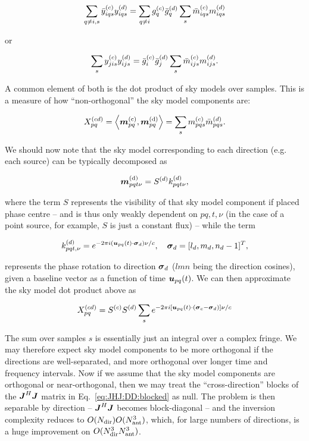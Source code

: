 \documentclass[useAMS,usenatbib]{mn2e}
\newcommand{\mat}[1]{{\bmath{#1}}}
\newcommand{\JJ}{\mat{J}} %
\newcommand{\JHJ}{\JJ^H\JJ} %
\begin{document}
\[
  \sum\limits_{q\ne i,s} \bar{y}^{(c)}_{iqs} y^{(d)}_{iqs} = \sum\limits_{q\ne i} g^{(c)}_q \bar{g}^{(d)}_q \sum_s \bar{m}^{(c)}_{iqs} m^{(d)}_{iqs}
\]

or

\[
  \sum\limits_{s} y^{(c)}_{jis} y^{(d)}_{ijs} = \bar{g}^{(c)}_i \bar{g}^{(d)}_j \sum_s \bar{m}^{(c)}_{ijs} m^{(d)}_{ijs}.
\]

A common element of both is the dot product of sky models over samples. This is a measure of how ``non-orthogonal'' the 
sky model components are:

\begin{equation}
\label{eq:Xpqcd}
X_{pq}^{(cd)} = \left \langle \bmath{m}_{pq}^\mathrm{(c)},\bmath{m}^\mathrm{(d)}_{pq} \right \rangle = \sum_s \mmc_{pqs} \mmdH_{pqs}.
\end{equation}

We should now note that the sky model corresponding to each direction (e.g. each source) can be typically decomposed as

\[
\bmath{m}_{pqt\nu}^\mathrm{(d)} = S^{(d)} k^{(d)}_{pqt\nu}, 
\]

where the term $S$ represents the visibility of that sky model component if placed phase centre -- and is thus only 
weakly dependent on $pq,t,\nu$ (in the case of a point source, for example, $S$ is just a constant flux) -- while the term

\[
k^{(d)}_{pqt,\nu} = e^{-2\pi i (\bmath{u}_{pq}(t)\cdot\bmath{\sigma}_d)\nu/c},~~~\bmath{\sigma}_d = [l_d,m_d,n_d-1]^T,
\]

represents the phase rotation to direction $\bmath{\sigma}_d$ ($lmn$ being the direction cosines), given a 
baseline vector as a function of time $\bmath{u}_{pq}(t)$. We can then approximate the sky model dot product above as

\[
X_{pq}^{(cd)} = S^{(c)}S^{(d)} \sum_s e^{-2\pi i [\bmath{u}_{pq}(t)\cdot(\bmath{\sigma}_c-\bmath{\sigma}_d) ]\nu/c}
\]

The sum over samples $s$ is essentially just an integral over a complex fringe. We may therefore expect sky model 
components to be more orthogonal if the directions are well-separated, and more orthogonal over longer time and
frequency intervals. Now if we assume that the sky model components are orthogonal or near-orthogonal, then
we may treat the ``cross-direction'' blocks of the $\JHJ$ matrix in Eq.~\ref{eq:JHJ:DD:blocked} as null. The problem is 
then separable by direction -- $\JHJ$ becomes block-diagonal -- and the inversion complexity reduces to $O(N_\mathrm{dir})O(N_\mathrm{ant}^3)$, 
which, for large numbers of directions, is a huge improvement on $O(N_\mathrm{dir}^3N_\mathrm{ant}^3)$. 
\end{document}

